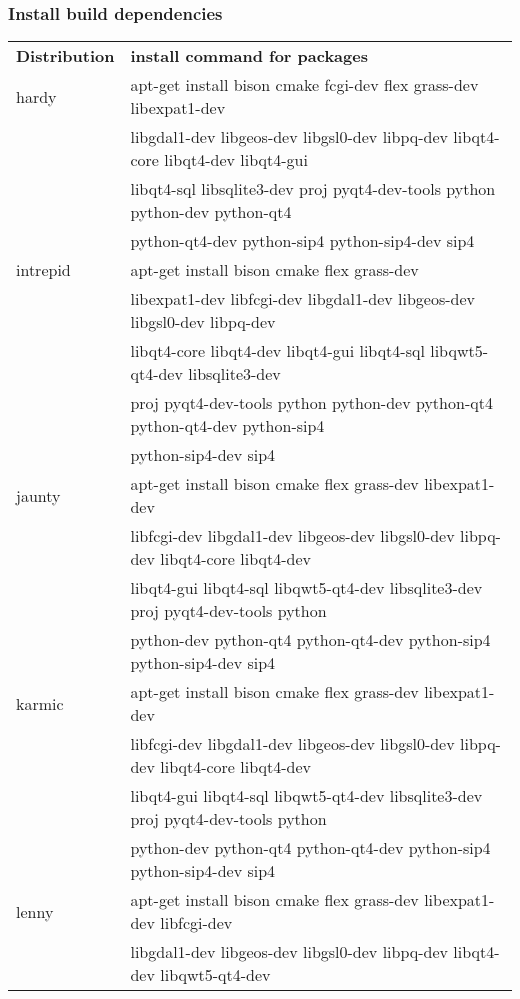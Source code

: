 \subsubsection{Install build dependencies}
\begin{center}\begin{tabular}{|l|l|}
\hline \textbf{Distribution} & \textbf{install command for packages} \\
hardy & apt-get install  bison cmake fcgi-dev flex grass-dev libexpat1-dev \\
& libgdal1-dev libgeos-dev libgsl0-dev libpq-dev libqt4-core libqt4-dev libqt4-gui \\
& libqt4-sql libsqlite3-dev proj pyqt4-dev-tools python python-dev python-qt4 \\
& python-qt4-dev python-sip4 python-sip4-dev sip4 \\
\hline intrepid & apt-get install  bison cmake flex grass-dev \\
& libexpat1-dev libfcgi-dev libgdal1-dev libgeos-dev libgsl0-dev libpq-dev \\
& libqt4-core libqt4-dev libqt4-gui libqt4-sql libqwt5-qt4-dev libsqlite3-dev \\
& proj pyqt4-dev-tools python python-dev python-qt4 python-qt4-dev python-sip4 \\
& python-sip4-dev sip4 \\
\hline jaunty & apt-get install  bison cmake flex grass-dev libexpat1-dev \\
& libfcgi-dev libgdal1-dev libgeos-dev libgsl0-dev libpq-dev libqt4-core libqt4-dev \\
& libqt4-gui libqt4-sql libqwt5-qt4-dev libsqlite3-dev proj pyqt4-dev-tools python \\
& python-dev python-qt4 python-qt4-dev python-sip4 python-sip4-dev sip4 \\
\hline karmic & apt-get install  bison cmake flex grass-dev libexpat1-dev \\
& libfcgi-dev libgdal1-dev libgeos-dev libgsl0-dev libpq-dev libqt4-core libqt4-dev \\
& libqt4-gui libqt4-sql libqwt5-qt4-dev libsqlite3-dev proj pyqt4-dev-tools python \\
& python-dev python-qt4 python-qt4-dev python-sip4 python-sip4-dev sip4 \\
\hline lenny & apt-get install  bison cmake flex grass-dev libexpat1-dev libfcgi-dev \\
& libgdal1-dev libgeos-dev libgsl0-dev libpq-dev libqt4-dev libqwt5-qt4-dev \\

\end{tabular}
\end{center}
